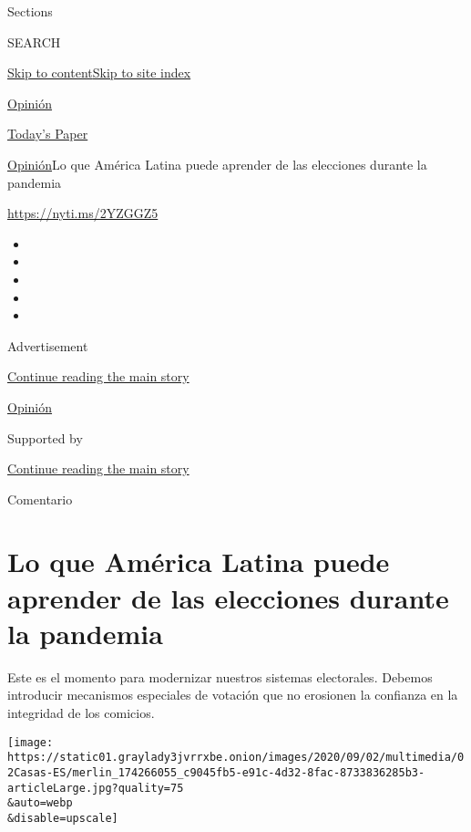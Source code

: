 Sections

SEARCH

\protect\hyperlink{site-content}{Skip to
content}\protect\hyperlink{site-index}{Skip to site index}

\href{https://www.nytimes3xbfgragh.onion/es/section/opinion}{Opinión}

\href{https://myaccount.nytimes3xbfgragh.onion/auth/login?response_type=cookie\&client_id=vi}{}

\href{https://www.nytimes3xbfgragh.onion/section/todayspaper}{Today's
Paper}

\href{/es/section/opinion}{Opinión}\textbar{}Lo que América Latina puede
aprender de las elecciones durante la pandemia

\url{https://nyti.ms/2YZGGZ5}

\begin{itemize}
\item
\item
\item
\item
\item
\end{itemize}

Advertisement

\protect\hyperlink{after-top}{Continue reading the main story}

\href{/es/section/opinion}{Opinión}

Supported by

\protect\hyperlink{after-sponsor}{Continue reading the main story}

Comentario

\hypertarget{lo-que-amuxe9rica-latina-puede-aprender-de-las-elecciones-durante-la-pandemia}{%
\section{Lo que América Latina puede aprender de las elecciones durante
la
pandemia}\label{lo-que-amuxe9rica-latina-puede-aprender-de-las-elecciones-durante-la-pandemia}}

Este es el momento para modernizar nuestros sistemas electorales.
Debemos introducir mecanismos especiales de votación que no erosionen la
confianza en la integridad de los comicios.

\texttt{[image: https://static01.graylady3jvrrxbe.onion/images/2020/09/02/multimedia/02Casas-ES/merlin\_174266055\_c9045fb5-e91c-4d32-8fac-8733836285b3-articleLarge.jpg?quality=75\\\&auto=webp\\\&disable=upscale]}

